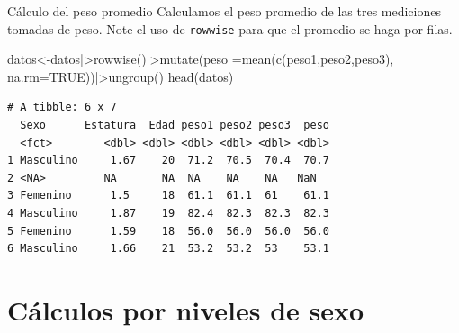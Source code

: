 \documentclass[
  ignorenonframetext,
  aspectratio=169,
  spanish,
]{beamer}
\newenvironment{Shaded}{\begin{snugshade}}{\end{snugshade}}
\newcommand{\AttributeTok}[1]{\textcolor[rgb]{0.40,0.45,0.13}{#1}}
\newcommand{\ConstantTok}[1]{\textcolor[rgb]{0.56,0.35,0.01}{#1}}
\newcommand{\FunctionTok}[1]{\textcolor[rgb]{0.28,0.35,0.67}{#1}}
\newcommand{\NormalTok}[1]{\textcolor[rgb]{0.00,0.23,0.31}{#1}}
\newcommand{\OtherTok}[1]{\textcolor[rgb]{0.00,0.23,0.31}{#1}}
\newcommand{\SpecialCharTok}[1]{\textcolor[rgb]{0.37,0.37,0.37}{#1}}
\begin{document}
\begin{frame}[fragile]{Cálculo del peso promedio}
\label{cuxe1lculo-del-peso-promedio}
Calculamos el peso promedio de las tres mediciones tomadas de peso. Note
el uso de \texttt{rowwise} para que el promedio se haga por filas.

\begin{Shaded}
\begin{Highlighting}[]
\NormalTok{datos}\OtherTok{\textless{}{-}}\NormalTok{datos}\SpecialCharTok{|\textgreater{}}\FunctionTok{rowwise}\NormalTok{()}\SpecialCharTok{|\textgreater{}}\FunctionTok{mutate}\NormalTok{(peso}
            \OtherTok{=}\FunctionTok{mean}\NormalTok{(}\FunctionTok{c}\NormalTok{(peso1,peso2,peso3),}
            \AttributeTok{na.rm=}\ConstantTok{TRUE}\NormalTok{))}\SpecialCharTok{|\textgreater{}}\FunctionTok{ungroup}\NormalTok{()}
\FunctionTok{head}\NormalTok{(datos)}
\end{Highlighting}
\end{Shaded}

\begin{verbatim}
# A tibble: 6 x 7
  Sexo      Estatura  Edad peso1 peso2 peso3  peso
  <fct>        <dbl> <dbl> <dbl> <dbl> <dbl> <dbl>
1 Masculino     1.67    20  71.2  70.5  70.4  70.7
2 <NA>         NA       NA  NA    NA    NA   NaN  
3 Femenino      1.5     18  61.1  61.1  61    61.1
4 Masculino     1.87    19  82.4  82.3  82.3  82.3
5 Femenino      1.59    18  56.0  56.0  56.0  56.0
6 Masculino     1.66    21  53.2  53.2  53    53.1
\end{verbatim}
\end{frame}

\section{Cálculos por niveles de
sexo}\label{cuxe1lculos-por-niveles-de-sexo}
\end{document}
